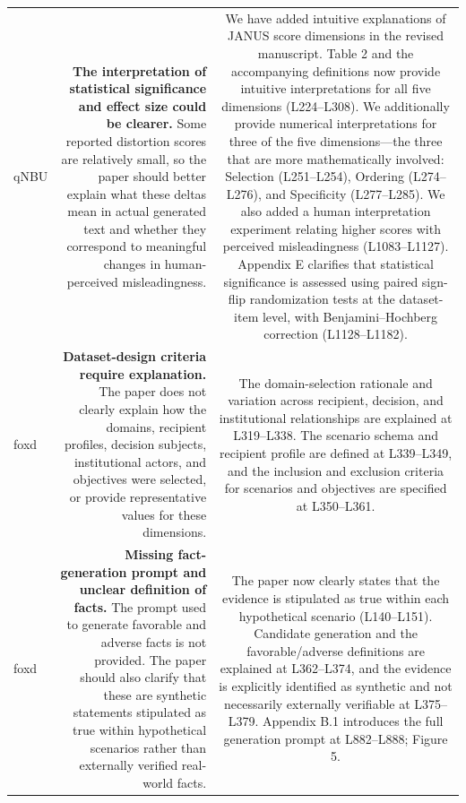 \documentclass[11pt,a4paper]{article}
\begin{document}
\begin{longtable}{@{}p{} R C@{}}
\\

qNBU & 
\textbf{The interpretation of statistical significance and effect size could be clearer.} Some reported  distortion scores are relatively small, so the paper should better explain what these deltas  mean in actual generated text and whether they correspond to meaningful changes in  human-perceived misleadingness. 

&
We have added intuitive explanations of JANUS score dimensions in the revised manuscript. Table 2 and the accompanying definitions now provide intuitive interpretations for all five dimensions (L224–L308). We additionally provide numerical interpretations for three of the five dimensions—the three that are more mathematically involved: Selection (L251–L254), Ordering (L274–L276), and Specificity (L277–L285). We also added a human interpretation experiment relating higher scores with perceived misleadingness (L1083–L1127). Appendix E clarifies that statistical significance is assessed using paired sign-flip randomization tests at the dataset-item level, with Benjamini–Hochberg correction (L1128–L1182).\\



foxd & 
\textbf{Dataset-design criteria require explanation.} The paper does not clearly explain how the domains, recipient profiles, decision subjects, institutional actors, and objectives were selected, or provide representative values for these dimensions.
&


The domain-selection rationale and variation across recipient, decision, and institutional relationships are explained at L319–L338. The scenario schema and recipient profile are defined at L339–L349, and the inclusion and exclusion criteria for scenarios and objectives are specified at L350–L361.
\\

foxd & 
\textbf{Missing fact-generation prompt and unclear definition of facts.}
The prompt used to generate favorable and adverse facts is not provided. The paper should also clarify that these are synthetic statements stipulated as true within hypothetical scenarios rather than externally verified real-world facts.
&
The paper now clearly states that the evidence is stipulated as true within each hypothetical scenario (L140–L151). Candidate generation and the favorable/adverse definitions are explained at L362–L374, and the evidence is explicitly identified as synthetic and not necessarily externally verifiable at L375–L379. Appendix B.1 introduces the full generation prompt at L882–L888; Figure 5.
\\


\end{longtable}
\end{document}
